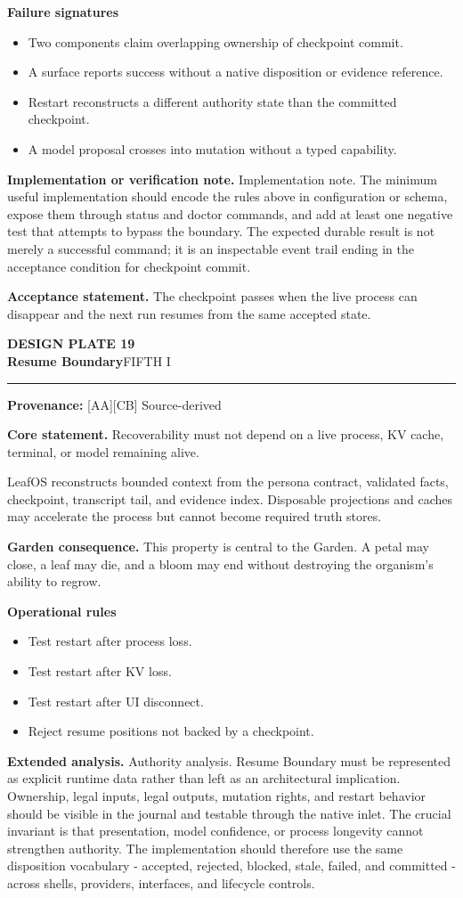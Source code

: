 \documentclass[10pt,letterpaper,oneside]{article}
\newcommand{\prov}[1]{\textcolor{gardenBlue}{\sffamily\footnotesize\textbf{Provenance:} #1}}
\newcommand{\platetitle}[3]{%
  \begin{minipage}[t][0.54in][t]{\textwidth}
  {\sffamily\bfseries\color{gardenDeep}\fontsize{9}{10}\selectfont DESIGN PLATE #1}\\[-1pt]
  {\sffamily\bfseries\color{gardenInk}\fontsize{16.5}{18}\selectfont #2}\hfill{\sffamily\color{gardenGreen}\large #3}
  \end{minipage}\vspace{-2pt}\hrule\vspace{5pt}}
\begin{document}
\textbf{Failure signatures}
\begin{itemize}
\item Two components claim overlapping ownership of checkpoint commit.
\item A surface reports success without a native disposition or evidence reference.
\item Restart reconstructs a different authority state than the committed checkpoint.
\item A model proposal crosses into mutation without a typed capability.
\end{itemize}
\textbf{Implementation or verification note.} Implementation note. The minimum useful implementation should encode the rules above in configuration or schema, expose them through status and doctor commands, and add at least one negative test that attempts to bypass the boundary. The expected durable result is not merely a successful command; it is an inspectable event trail ending in the acceptance condition for checkpoint commit.

\begin{acceptbox}
\textbf{Acceptance statement.} The checkpoint passes when the live process can disappear and the next run resumes from the same accepted state.
\end{acceptbox}
\newpage
\platetitle{19}{Resume Boundary}{FIFTH I}
\prov{[AA][CB] Source-derived}
\fontsize{8.85}{10.45}\selectfont
\begin{corebox}
\textbf{Core statement.} Recoverability must not depend on a live process, KV cache, terminal, or model remaining alive.
\end{corebox}
LeafOS reconstructs bounded context from the persona contract, validated facts, checkpoint, transcript tail, and evidence index. Disposable projections and caches may accelerate the process but cannot become required truth stores.

\textbf{Garden consequence.} This property is central to the Garden. A petal may close, a leaf may die, and a bloom may end without destroying the organism's ability to regrow.

\textbf{Operational rules}
\begin{itemize}
\item Test restart after process loss.
\item Test restart after KV loss.
\item Test restart after UI disconnect.
\item Reject resume positions not backed by a checkpoint.
\end{itemize}
\textbf{Extended analysis.} Authority analysis. Resume Boundary must be represented as explicit runtime data rather than left as an architectural implication. Ownership, legal inputs, legal outputs, mutation rights, and restart behavior should be visible in the journal and testable through the native inlet. The crucial invariant is that presentation, model confidence, or process longevity cannot strengthen authority. The implementation should therefore use the same disposition vocabulary - accepted, rejected, blocked, stale, failed, and committed - across shells, providers, interfaces, and lifecycle controls.
\end{document}
